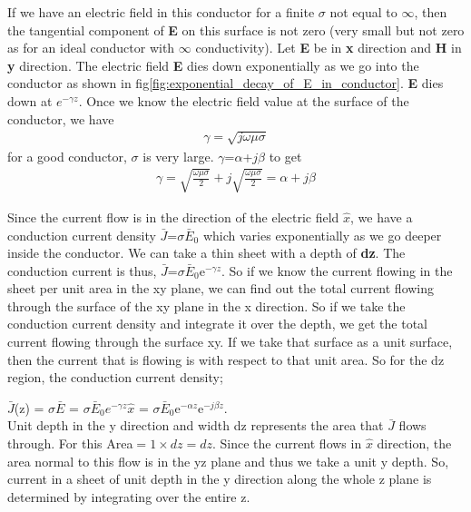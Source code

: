 If we have an electric field in this conductor for a finite $\sigma$ not equal to $\infty$, then the tangential component of \textbf{E} on this surface is not zero (very small but not zero as for an ideal conductor with $\infty$ conductivity). Let \textbf{E} be in \textbf{x} direction and \textbf{H} in \textbf{y} direction. The electric field \textbf{E} dies down exponentially as we go into the conductor as shown in fig\ref{fig:exponential_decay_of_E_in_conductor}. \textbf{E} dies down at $e^{-\gamma z}$. Once we know the electric field value at the surface of the conductor, we have
\begin{align}
\gamma=\sqrt{\textit{j}\omega\mu\sigma}
\end{align}
for a good conductor, $\sigma$ is very large. $\gamma$=$\alpha$+$j\beta$ to get
\begin{align}
\gamma=\sqrt{\frac{\omega\mu\sigma}{2}}+\textit{j}\sqrt{\frac{\omega\mu\sigma}{2}}=\alpha+\textit{j}\beta
\end{align}

Since the current flow is in the direction of the electric field $\hat{x}$, we have a conduction current density $\bar{J}$=$\sigma\bar{E}_0$ which varies exponentially as we go deeper inside the conductor. We can take a thin sheet with a depth of \textbf{dz}. The conduction current is thus, $\bar{J}$=$\sigma\bar{E}_0$e$^{-\gamma z}$. So if we know the current flowing in the sheet per unit area in the xy plane, we can find out the total current flowing through the surface of the xy plane in the x direction. So if we take the conduction current density and integrate it over the depth, we get the total current flowing through the surface xy. If we take that surface as a unit surface, then the current that is flowing is with respect to that unit area. So for the dz region, the conduction current density;

$\bar{J}$(z) = $\sigma$$\bar{E}$ = $\sigma\bar{E}_0e^{-\gamma z} \hat{x}$ = $\sigma\bar{E}_0$e$^{-\alpha z}$e$^{-j\beta z}$.\\
Unit depth in the y direction and width dz represents the area that $\bar{J}$ flows through. For this Area$=1\times dz=dz$. Since the current flows in $\hat{x}$ direction, the area normal to this flow is in the yz plane and thus we take a unit y depth. So, current in a sheet of unit depth in the y direction along the whole z plane is determined by integrating over the entire z.

